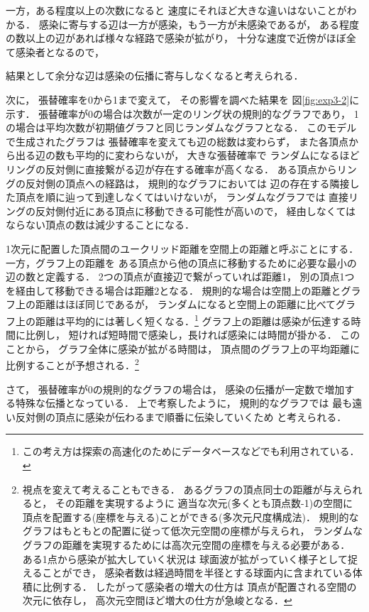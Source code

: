 \documentclass[10pt,oneside]{scrartcl}
\begin{document}
一方，ある程度以上の次数になると
速度にそれほど大きな違いはないことがわかる．
感染に寄与する辺は一方が感染，もう一方が未感染であるが，
ある程度の数以上の辺があれば様々な経路で感染が拡がり，
十分な速度で近傍がほぼ全て感染者となるので，

結果として余分な辺は感染の伝播に寄与しなくなると考えられる．

次に，
張替確率を0から1まで変えて，
その影響を調べた結果を
図\ref{fig:exp3-2}に示す．
張替確率が0の場合は次数が一定のリング状の規則的なグラフであり，
1の場合は平均次数が初期値グラフと同じランダムなグラフとなる．
このモデルで生成されたグラフは
張替確率を変えても辺の総数は変わらず，
また各頂点から出る辺の数も平均的に変わらないが，
大きな張替確率で
ランダムになるほどリングの反対側に直接繋がる辺が存在する確率が高くなる．
ある頂点からリングの反対側の頂点への経路は，
規則的なグラフにおいては
辺の存在する隣接した頂点を順に辿って到達しなくてはいけないが，
ランダムなグラフでは
直接リングの反対側付近にある頂点に移動できる可能性が高いので，
経由しなくてはならない頂点の数は減少することになる．

1次元に配置した頂点間のユークリッド距離を空間上の距離と呼ぶことにする．
一方，グラフ上の距離を
ある頂点から他の頂点に移動するために必要な最小の辺の数と定義する．
2つの頂点が直接辺で繋がっていれば距離1，
別の頂点1つを経由して移動できる場合は距離2となる．
規則的な場合は空間上の距離とグラフ上の距離はほぼ同じであるが，
ランダムになると空間上の距離に比べてグラフ上の距離は平均的には著しく短くなる．\footnote{この考え方は探索の高速化のためにデータベースなどでも利用されている．}
グラフ上の距離は感染が伝達する時間に比例し，
短ければ短時間で感染し，長ければ感染には時間が掛かる．
このことから，
グラフ全体に感染が拡がる時間は，
頂点間のグラフ上の平均距離に比例することが予想される．\footnote{視点を変えて考えることもできる．
あるグラフの頂点同士の距離が与えられると，
その距離を実現するように
適当な次元(多くとも頂点数-1)の空間に
頂点を配置する(座標を与える)ことができる(多次元尺度構成法)．
規則的なグラフはもともとの配置に従って低次元空間の座標が与えられ，
ランダムなグラフの距離を実現するためには高次元空間の座標を与える必要がある．
ある1点から感染が拡大していく状況は
球面波が拡がっていく様子として捉えることができ，
感染者数は経過時間を半径とする球面内に含まれている体積に比例する．
したがって感染者の増大の仕方は
頂点が配置される空間の次元に依存し，
高次元空間ほど増大の仕方が急峻となる．}

さて，
張替確率が0の規則的なグラフの場合は，
感染の伝播が一定数で増加する特殊な伝播となっている．
上で考察したように，
規則的なグラフでは
最も遠い反対側の頂点に感染が伝わるまで順番に伝染していくため
と考えられる．
\end{document}
